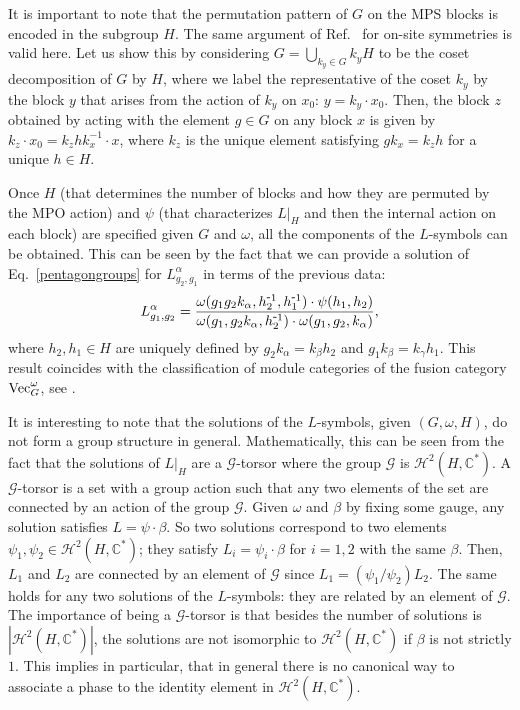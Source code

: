 \documentclass[a4paper,twocolumn,11pt,accepted=2023-02-10]{quantumarticle}
\newcommand{\myinv}[1]{#1^{\scalebox{0.9}[1.0]{-}1}}
\begin{document}
It is important to note that the permutation pattern of $G$ on the MPS blocks is encoded in the subgroup $H$. The same argument of Ref.\ \cite{Schuch11} for on-site symmetries is valid here. Let us show this by considering $G=\bigcup_{k_y\in G} k_y H$ to be the coset decomposition of $G$ by $H$, where we label the representative of the coset $k_y$ by the block $y$ that arises from the action of $k_y$ on $x_0$: $y=k_y{\cdot}x_0$. Then, the block $z$ obtained by acting with the element $g\in G$ on any block $x$ is given by $k_z{\cdot}x_0 =k_zhk_x^{-1}{\cdot}x  $, where $k_z$ is the unique element satisfying $g k_x = k_z h$ for a unique $h \in H$.

Once $H$ (that determines the number of blocks and how they are permuted by the MPO action) and $\psi$ (that characterizes $L|_H$ and then the internal action on each block) are specified given $G$ and $\omega$, all the components of the $L$-symbols can be obtained. This can be seen by the fact that we can provide a solution of Eq.\ \eqref{pentagongroups} for $L_{g_2,g_1}^{\alpha}$ in terms of the previous data:
\begin{equation}\label{Lexpre}
L_{g_1,g_2}^{\alpha}
 = \frac{\omega(g_1 g_2 k_{\alpha},\myinv{h}_2,\myinv{h}_1) \cdot \psi({h}_1,{h}_2)}{\omega(g_1,g_2 k_{\alpha},\myinv{h}_2 ) \cdot \omega(g_1,g_2,k_{\alpha})},
 \end{equation}
where $h_2, h_1 \in H$ are uniquely defined by $g_2 k_{\alpha} = k_{\beta} h_2$ and $g_1 k_{\beta} = k_{\gamma} h_1$. This result coincides with the classification of module categories of the fusion category ${\rm Vec}_G^\omega$, see \cite{ostrik2006module}. 
 
It is interesting to note that the solutions of the $L$-symbols, given $(G,\omega, H)$, do not form a group structure in general. Mathematically, this can be seen from the fact that the solutions of ${L}|_H$ are a $\mathcal{G}$-torsor where the group $\mathcal{G}$ is $\mathcal{H}^2(H,\mathbb{C}^*)$. A $\mathcal{G}$-torsor is a set with a group action such that any two elements of the set are connected by an action of the group $\mathcal{G}$. Given $\omega$ and $\beta$ by fixing some gauge, any solution satisfies ${L}=\psi {\cdot} \beta$. So two solutions correspond to two elements $\psi_1,\psi_2\in \mathcal{H}^2(H,\mathbb{C}^*)$; they satisfy ${L}_i=\psi_i {\cdot} \beta$  for $i=1,2$ with the same $\beta$. Then,  ${L}_1$ and  ${L}_2$ are connected by an element of $\mathcal{G}$ since ${L}_1=( \psi_1 /\psi_2) {L}_2$. The same holds for any two solutions of the ${L}$-symbols: they are related by an element of $\mathcal{G}$. The importance of being a $\mathcal{G}$-torsor is that besides the number of solutions is $|\mathcal{H}^2(H,\mathbb{C}^*)|$, the solutions are not isomorphic to $\mathcal{H}^2(H,\mathbb{C}^*)$ if $\beta$ is not strictly $1$. This implies in particular, that in general there is no canonical way to associate a phase to the identity element in $\mathcal{H}^2(H,\mathbb{C}^*)$.
\end{document}
